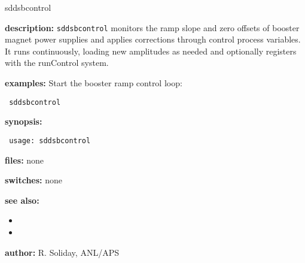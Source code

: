 %
\begin{sddsprog}{sddsbcontrol}
\item \textbf{description:}
\verb+sddsbcontrol+ monitors the ramp slope and zero offsets of booster magnet power supplies and applies corrections through control process variables. It runs continuously, loading new amplitudes as needed and optionally registers with the runControl system.

\item \textbf{examples:}
Start the booster ramp control loop:
\begin{flushleft}{\tt
sddsbcontrol\\
}\end{flushleft}

\item \textbf{synopsis:}
\begin{flushleft}{\tt
usage: sddsbcontrol\\
}\end{flushleft}

\item \textbf{files:} none

\item \textbf{switches:} none

\item \textbf{see also:}
\begin{itemize}
  \item {}
  \item {}
\end{itemize}

\item \textbf{author:} R. Soliday, ANL/APS
\end{sddsprog}
